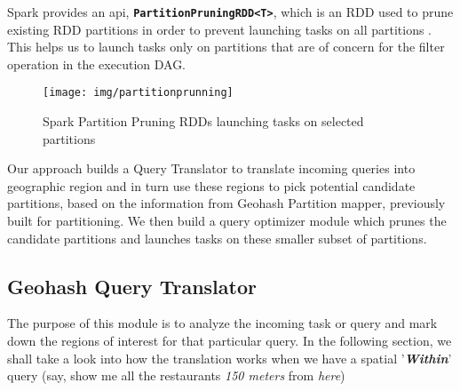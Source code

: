\documentclass[article,type=msc,colorback,12pt,accentcolor=tud1d]{tudthesis}
\begin{document}
				Spark provides an api, \textbf{\texttt{PartitionPruningRDD<T>}}, which is an RDD used to prune existing RDD partitions in order to prevent launching tasks on all partitions \cite{sparkapiPartitionPruning}. This helps us to launch tasks only on partitions that are of concern for the filter operation in the execution DAG. 
				
									
					\begin{figure}[h]
					\centering
					\texttt{[image: img/partitionprunning]}
					\caption{Spark Partition Pruning RDDs launching tasks on selected partitions}
					\label{fig:partitionprunning}
					\end{figure}
					
					Our approach builds a Query Translator to translate incoming queries into geographic region and in turn use these regions to pick potential candidate partitions, based on the information from Geohash Partition mapper, previously built for partitioning. We then build a query optimizer module which prunes the candidate partitions and launches tasks on these smaller subset of partitions.
									
		\subsection{Geohash Query Translator}
		
		\par The purpose of this module is to analyze the incoming task or query and mark down the regions of interest for that particular query. In the following section, we shall take a look into how the translation works when we have a spatial '\textbf{\textit{Within}}' query (say, show me all the restaurants \textit{150 meters} from \textit{here})
\end{document}
